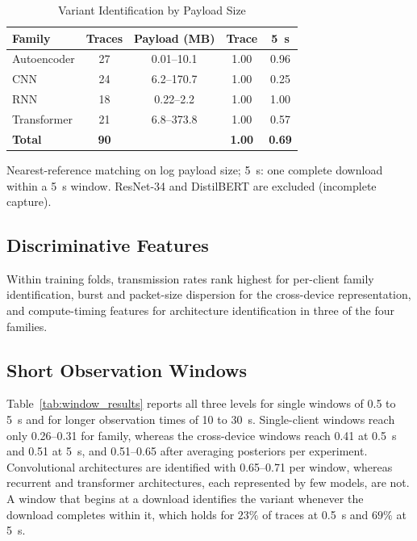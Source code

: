 \documentclass[conference]{IEEEtran}
\begin{document}
\begin{table}[!htbp]
\centering
\caption{Variant Identification by Payload Size}
\label{tab:variant_results}
\scriptsize
\renewcommand{\arraystretch}{1.05}
\setlength{\tabcolsep}{3pt}
\begin{tabular}{lcccc}
\hline
\textbf{Family} & \textbf{Traces} & \textbf{Payload (MB)} & \textbf{Trace} & \textbf{5~s} \\
\hline
Autoencoder & 27 & 0.01--10.1  & 1.00 & 0.96 \\
CNN         & 24 & 6.2--170.7  & 1.00 & 0.25 \\
RNN         & 18 & 0.22--2.2   & 1.00 & 1.00 \\
Transformer & 21 & 6.8--373.8  & 1.00 & 0.57 \\
\hline
\textbf{Total} & \textbf{90} & & \textbf{1.00} & \textbf{0.69} \\
\hline
\end{tabular}

\vspace{2pt}
\parbox{0.95\columnwidth}{\scriptsize Nearest-reference matching on log payload
size; 5~s: one complete download within a 5~s window. ResNet-34 and DistilBERT
are excluded (incomplete capture).}
\end{table}

\subsection{Discriminative Features}
\label{subsec:features}
Within training folds, transmission rates rank highest for per-client family
identification, burst and packet-size dispersion for the cross-device
representation, and compute-timing features for architecture identification in
three of the four families.

\subsection{Short Observation Windows}
Table~\ref{tab:window_results} reports all three levels for single windows of
0.5 to 5~s and for longer observation times of 10 to 30~s. Single-client windows reach only 0.26--0.31 for family, whereas the
cross-device windows reach 0.41 at 0.5~s and 0.51 at 5~s, and 0.51--0.65 after
averaging posteriors per experiment. Convolutional architectures are identified
with 0.65--0.71 per window, whereas recurrent and transformer architectures,
each represented by few models, are not. A window that begins at a download
identifies the variant whenever the download completes within it, which holds
for $23\%$ of traces at 0.5~s and $69\%$ at 5~s.
\end{document}
